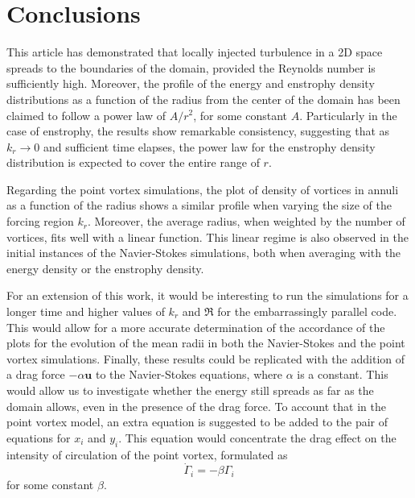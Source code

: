 \documentclass[../main.tex]{subfiles}
\begin{document}
\section{Conclusions}\label{sec:conclusions}
This article has demonstrated that locally injected turbulence in a 2D space spreads to the boundaries of the domain, provided the Reynolds number is sufficiently high. Moreover, the profile of the energy and enstrophy density distributions as a function of the radius from the center of the domain has been claimed to follow a power law of $A/r^2$, for some constant $A$. Particularly in the case of enstrophy, the results show remarkable consistency, suggesting that as $k_r\to 0$ and sufficient time elapses, the power law for the enstrophy density distribution is expected to cover the entire range of $r$.

Regarding the point vortex simulations, the plot of density of vortices in annuli as a function of the radius shows a similar profile when varying the size of the forcing region $k_r$. Moreover, the average radius, when weighted by the number of vortices, fits well with a linear function. This linear regime is also observed in the initial instances of the Navier-Stokes simulations, both when averaging with the energy density or the enstrophy density.

For an extension of this work, it would be interesting to run the simulations for a longer time and higher values of $k_r$ and $\Re$ for the embarrassingly parallel code. This would allow for a more accurate determination of the accordance of the plots for the evolution of the mean radii in both the Navier-Stokes and the point vortex simulations.
Finally, these results could be replicated with the addition of a drag force $-\alpha \mathbf{u}$ to the Navier-Stokes equations, where $\alpha$ is a constant. This would allow us to investigate whether the energy still spreads as far as the domain allows, even in the presence of the drag force. To account that in the point vortex model, an extra equation is suggested to be added to the pair of equations for $x_i$ and $y_i$. This equation would concentrate the drag effect on the intensity of circulation of the point vortex, formulated as
\begin{equation}
	\dot{\Gamma}_i = -\beta \Gamma_i
\end{equation}
for some constant $\beta$.
\end{document}
